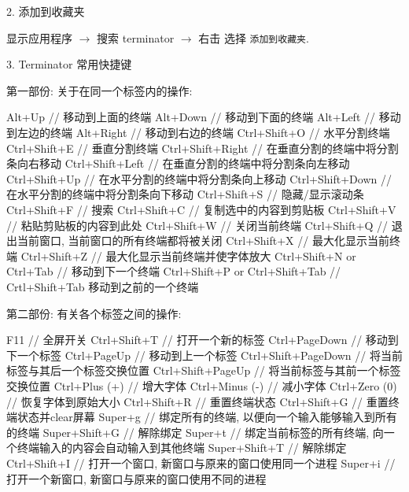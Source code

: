 \documentclass[openany, fontset=windowsold]{ctexbook}
\theoremstyle{kaiti}
\theoremstyle{normal}
\begin{document}
2. 添加到收藏夹

显示应用程序 $\rightarrow$ 搜索 terminator $\rightarrow$ 右击 选择 \verb|添加到收藏夹|.

3. Terminator 常用快捷键

第一部份: 关于在同一个标签内的操作:

\begin{bash}
  Alt+Up                          // 移动到上面的终端
  Alt+Down                        // 移动到下面的终端
  Alt+Left                        // 移动到左边的终端
  Alt+Right                       // 移动到右边的终端
  Ctrl+Shift+O                    // 水平分割终端
  Ctrl+Shift+E                    // 垂直分割终端
  Ctrl+Shift+Right                // 在垂直分割的终端中将分割条向右移动
  Ctrl+Shift+Left                 // 在垂直分割的终端中将分割条向左移动
  Ctrl+Shift+Up                   // 在水平分割的终端中将分割条向上移动
  Ctrl+Shift+Down                 // 在水平分割的终端中将分割条向下移动
  Ctrl+Shift+S                    // 隐藏/显示滚动条
  Ctrl+Shift+F                    // 搜索
  Ctrl+Shift+C                    // 复制选中的内容到剪贴板
  Ctrl+Shift+V                    // 粘贴剪贴板的内容到此处
  Ctrl+Shift+W                    // 关闭当前终端
  Ctrl+Shift+Q                    // 退出当前窗口, 当前窗口的所有终端都将被关闭
  Ctrl+Shift+X                    // 最大化显示当前终端
  Ctrl+Shift+Z                    // 最大化显示当前终端并使字体放大
  Ctrl+Shift+N or Ctrl+Tab        // 移动到下一个终端
  Ctrl+Shift+P or Ctrl+Shift+Tab  // Crtl+Shift+Tab 移动到之前的一个终端
\end{bash}

第二部份: 有关各个标签之间的操作:

\begin{bash}
  F11                             // 全屏开关
  Ctrl+Shift+T                    // 打开一个新的标签
  Ctrl+PageDown                   // 移动到下一个标签
  Ctrl+PageUp                     // 移动到上一个标签
  Ctrl+Shift+PageDown             // 将当前标签与其后一个标签交换位置
  Ctrl+Shift+PageUp               // 将当前标签与其前一个标签交换位置
  Ctrl+Plus (+)                   // 增大字体
  Ctrl+Minus (-)                  // 减小字体
  Ctrl+Zero (0)                   // 恢复字体到原始大小
  Ctrl+Shift+R                    // 重置终端状态
  Ctrl+Shift+G                    // 重置终端状态并clear屏幕
  Super+g                         // 绑定所有的终端, 以便向一个输入能够输入到所有的终端
  Super+Shift+G                   // 解除绑定
  Super+t                         // 绑定当前标签的所有终端, 向一个终端输入的内容会自动输入到其他终端
  Super+Shift+T                   // 解除绑定
  Ctrl+Shift+I                    // 打开一个窗口, 新窗口与原来的窗口使用同一个进程
  Super+i                         // 打开一个新窗口, 新窗口与原来的窗口使用不同的进程
\end{bash}
\end{document}
